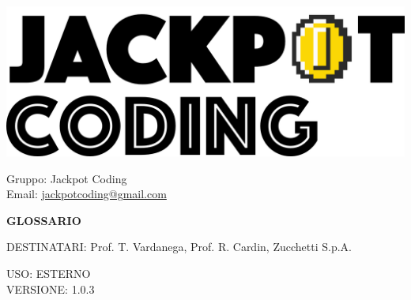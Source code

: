 \documentclass[5pt]{article}
\begin{document}
\begin{minipage}[t]{0.50\textwidth}
    \begin{flushleft}
        \hspace{10pt}
        \includegraphics[scale=0.65]{jackpot-logo.png} 
    \end{flushleft}
\end{minipage}
\hspace{-60pt} %
\begin{flushright}
    \begin{minipage}[t]{0.50\textwidth}
        \begin{flushright}
            Gruppo: {\Large Jackpot Coding}\\
            Email: \href{mailto:jackpotcoding@gmail.com}{jackpotcoding@gmail.com}
        \end{flushright}
    \end{minipage}
\end{flushright}

\vspace{24pt}

\begin{center}
    \textbf{\LARGE GLOSSARIO}
\end{center}

\vspace{13pt}

\begin{flushleft}
    \begin{spacing}{1.5}
        DESTINATARI: Prof. T. Vardanega, Prof. R. Cardin, Zucchetti S.p.A.\\%
    \end{spacing}
\end{flushleft}

\begin{flushright}
    \begin{spacing}{1}
        USO: ESTERNO\\
        VERSIONE: 1.0.3\\
    \end{spacing}
\end{flushright}
\end{document}
